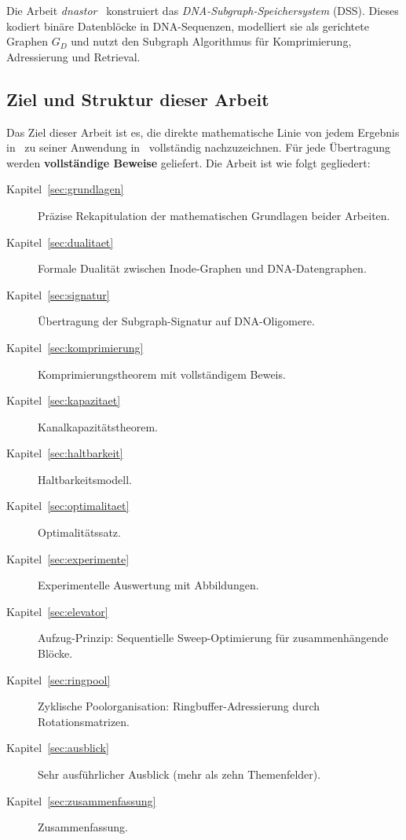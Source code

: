 ﻿\documentclass[a4paper,12pt]{article}
\theoremstyle{definition}
\theoremstyle{plain}
\begin{document}
Die Arbeit \textit{dnastor}~\cite{dnastor} konstruiert das
\emph{DNA-Subgraph-Speichersystem} (DSS).  Dieses kodiert binäre
Datenblöcke in DNA-Sequenzen, modelliert sie als gerichtete Graphen
$G_D$ und nutzt den Subgraph Algorithmus für Komprimierung,
Adressierung und Retrieval.

\subsection{Ziel und Struktur dieser Arbeit}

Das Ziel dieser Arbeit ist es, die direkte mathematische Linie von jedem
Ergebnis in~\cite{dusgraph} zu seiner Anwendung in~\cite{dnastor}
vollständig nachzuzeichnen.  Für jede Übertragung werden
\textbf{vollständige Beweise} geliefert.  Die Arbeit ist wie folgt
gegliedert:

\begin{description}
  \item[Kapitel~\ref{sec:grundlagen}] Präzise Rekapitulation der
        mathematischen Grundlagen beider Arbeiten.
  \item[Kapitel~\ref{sec:dualitaet}] Formale Dualität zwischen
        Inode-Graphen und DNA-Datengraphen.
  \item[Kapitel~\ref{sec:signatur}] Übertragung der Subgraph-Signatur
        auf DNA-Oligomere.
  \item[Kapitel~\ref{sec:komprimierung}] Komprimierungstheorem mit
        vollständigem Beweis.
  \item[Kapitel~\ref{sec:kapazitaet}] Kanalkapazitätstheorem.
  \item[Kapitel~\ref{sec:haltbarkeit}] Haltbarkeitsmodell.
  \item[Kapitel~\ref{sec:optimalitaet}] Optimalitätssatz.
  \item[Kapitel~\ref{sec:experimente}] Experimentelle Auswertung mit
        Abbildungen.
  \item[Kapitel~\ref{sec:elevator}] Aufzug-Prinzip: Sequentielle
        Sweep-Optimierung für zusammenhängende Blöcke.
  \item[Kapitel~\ref{sec:ringpool}] Zyklische Poolorganisation:
        Ringbuffer-Adressierung durch Rotationsmatrizen.
  \item[Kapitel~\ref{sec:ausblick}] Sehr ausführlicher Ausblick
        (mehr als zehn Themenfelder).
  \item[Kapitel~\ref{sec:zusammenfassung}] Zusammenfassung.
\end{description}
\end{document}
